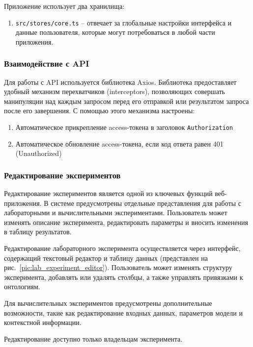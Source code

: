 Приложение использует два хранилища:

\begin{enumerate}
\item \texttt{src/stores/core.ts} -- отвечает за глобальные настройки интерфейса и данные пользователя, которые могут потребоваться в любой части приложения.
\end{enumerate}

\subsubsection{Взаимодействие с API}

Для работы с API используется библиотека Axios.
Библиотека предоставляет удобный механизм перехватчиков (interceptors), позволяющих совершать манипуляции над каждым запросом перед его отправкой или результатом запроса после его завершения.
С помощью этого механизма настроены:
\begin{enumerate}
\item Автоматическое прикрепление access-токена в заголовок \texttt{Authorization}
\item Автоматическое обновление access-токена, если код ответа равен 401 (Unauthorized)
\end{enumerate}

\subsubsection{Редактирование экспериментов}

Редактирование экспериментов является одной из ключевых функций веб-приложения.
В системе предусмотрены отдельные представления для работы с лабораторными и вычислительными экспериментами.
Пользователь может изменять описание эксперимента, редактировать параметры и вносить изменения в таблицу результатов.

Редактирование лабораторного эксперимента осуществляется через интерфейс, содержащий текстовый редактор и таблицу данных (представлен на рис.~\ref{pic:lab_experiment_editor}).
Пользователь может изменять структуру эксперимента, добавлять или удалять столбцы, а также управлять привязками к онтологиям.

Для вычислительных экспериментов предусмотрены дополнительные возможности, такие как редактирование входных данных, параметров модели и контекстной информации.

Редактирование доступно только владельцам эксперимента.

